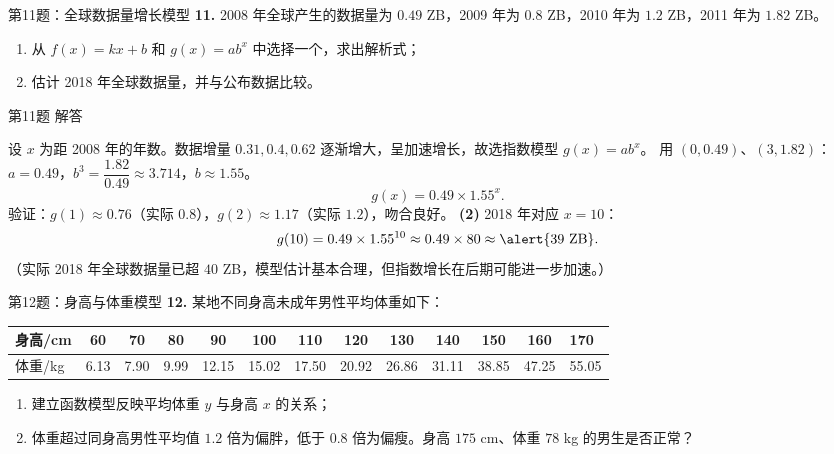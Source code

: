 \documentclass[10pt,aspectratio=169,serif]{beamer}
\begin{document}
\begin{frame}[t]{第11题：全球数据量增长模型}
\textbf{11.} 2008 年全球产生的数据量为 $0.49$ ZB，2009 年为 $0.8$ ZB，2010 年为 $1.2$ ZB，2011 年为 $1.82$ ZB。
\begin{enumerate}
  \item 从 $f(x)=kx+b$ 和 $g(x)=ab^{x}$ 中选择一个，求出解析式；
  \item 估计 2018 年全球数据量，并与公布数据比较。
\end{enumerate}
\end{frame}

\begin{frame}[t]{第11题 解答}
\begin{tcolorbox}[colback=orange!10,colframe=orange,title=\textbf{解}]
设 $x$ 为距 2008 年的年数。数据增量 $0.31,0.4,0.62$ 逐渐增大，呈加速增长，故选\alert{指数模型} $g(x)=ab^{x}$。
\smallskip
用 $(0,0.49)$、$(3,1.82)$：$a=0.49$，$b^{3}=\dfrac{1.82}{0.49}\approx 3.714$，$b\approx 1.55$。
\[
g(x)=0.49\times 1.55^{x}.
\]
验证：$g(1)\approx 0.76$（实际 $0.8$），$g(2)\approx 1.17$（实际 $1.2$），吻合良好。
\smallskip
\textbf{(2)} 2018 年对应 $x=10$：
\[
g(10)=0.49\times 1.55^{10}\approx 0.49\times 80\approx \alert{39\ \text{ZB}}.
\]
（实际 2018 年全球数据量已超 $40$ ZB，模型估计基本合理，但指数增长在后期可能进一步加速。）
\end{tcolorbox}
\end{frame}

\begin{frame}[t]{第12题：身高与体重模型}
\textbf{12.} 某地不同身高未成年男性平均体重如下：
\smallskip
\begin{center}
\begin{tabular}{l|ccccccccccc}
身高/cm & 60&70&80&90&100&110&120&130&140&150&160&170\\ \hline
体重/kg & 6.13&7.90&9.99&12.15&15.02&17.50&20.92&26.86&31.11&38.85&47.25&55.05
\end{tabular}
\end{center}
\begin{enumerate}
  \item 建立函数模型反映平均体重 $y$ 与身高 $x$ 的关系；
  \item 体重超过同身高男性平均值 $1.2$ 倍为偏胖，低于 $0.8$ 倍为偏瘦。身高 $175$ cm、体重 $78$ kg 的男生是否正常？
\end{enumerate}
\end{frame}
\end{document}
